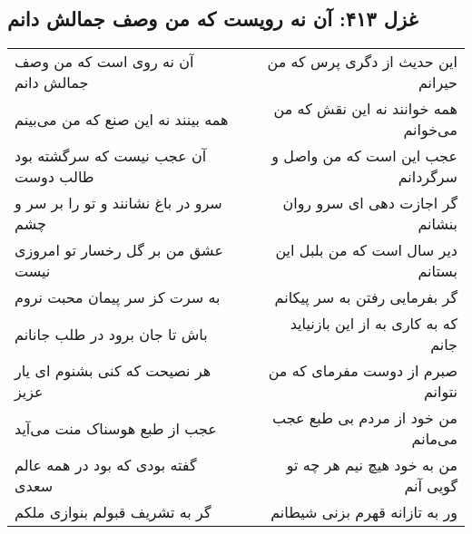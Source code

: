 \begin{center}
\section*{غزل ۴۱۳: آن نه رویست که من وصف جمالش دانم}
\label{sec:413}
\begin{longtable}{l p{0.5cm} r}
آن نه روی است که من وصف جمالش دانم
&&
این حدیث از دگری پرس که من حیرانم
\\
همه بینند نه این صنع که من می‌بینم
&&
همه خوانند نه این نقش که من می‌خوانم
\\
آن عجب نیست که سرگشته بود طالب دوست
&&
عجب این است که من واصل و سرگردانم
\\
سرو در باغ نشانند و تو را بر سر و چشم
&&
گر اجازت دهی ای سرو روان بنشانم
\\
عشق من بر گل رخسار تو امروزی نیست
&&
دیر سال است که من بلبل این بستانم
\\
به سرت کز سر پیمان محبت نروم
&&
گر بفرمایی رفتن به سر پیکانم
\\
باش تا جان برود در طلب جانانم
&&
که به کاری به از این بازنیاید جانم
\\
هر نصیحت که کنی بشنوم ای یار عزیز
&&
صبرم از دوست مفرمای که من نتوانم
\\
عجب از طبع هوسناک منت می‌آید
&&
من خود از مردم بی طبع عجب می‌مانم
\\
گفته بودی که بود در همه عالم سعدی
&&
من به خود هیچ نیم هر چه تو گویی آنم
\\
گر به تشریف قبولم بنوازی ملکم
&&
ور به تازانه قهرم بزنی شیطانم
\\
\end{longtable}
\end{center}
